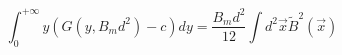 \begin{equation}
\int_{0}^{+\infty}
y(G(y,B_{m}d^{2})-c)dy=\frac{B_{m}d^{2}}{12}\int d^{2}\vec{x}
\tilde{B}^{2}(\vec{x})
\end{equation}

